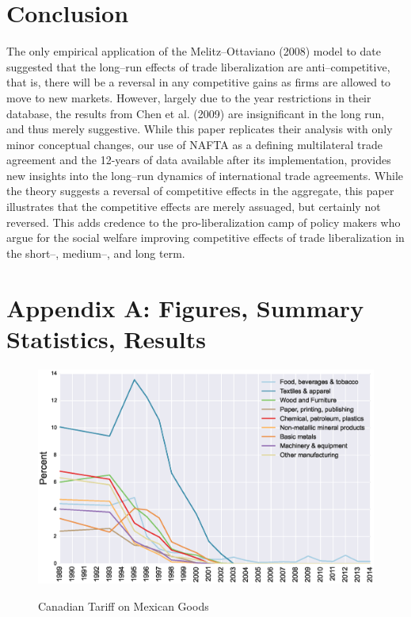 \section{Conclusion}\label{sec:conc}
The only empirical application of the Melitz--Ottaviano (2008) model to date suggested that the long--run effects of trade liberalization are anti--competitive, that is, there will be a reversal in any competitive gains as firms are allowed to move to new markets. However, largely due to the year restrictions in their database, the results from Chen et al. (2009) are insignificant in the long run, and thus merely suggestive. While this paper replicates their analysis with only minor conceptual changes, our use of NAFTA as a defining multilateral trade agreement and the 12-years of data available after its implementation, provides new insights into the long--run dynamics of international trade agreements. While the theory suggests a reversal of competitive effects in the aggregate, this paper illustrates that the competitive effects are merely assuaged, but certainly not reversed. This adds credence to the pro-liberalization camp of policy makers who argue for the social welfare improving competitive effects of trade liberalization in the short--, medium--, and long term.


\newpage

\section{Appendix A: Figures, Summary Statistics, Results}

\begin{figure}[htpb]\centering
\caption{Canadian Tariff on Mexican Goods}\vspace{0.2cm}
\includegraphics[scale=0.5]{tau_can_mex}
\label{fig:can_mex}
\end{figure} 

